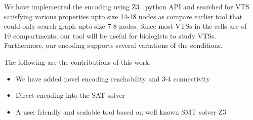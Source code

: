 We have implemented the encoding using Z3~\cite{z3} python API and searched for
VTS satisfying various properties upto size 14-18 nodes as compare
earlier tool that could only search graph upto size 7-8 nodes.
%
Since most VTSs in the cells are of 10 compartments,
our tool will be useful for biologists to study VTSs.
%
Furthermore, our encoding supports several variations of
the conditions.\newline

The following are the contributions of this work:
\begin{itemize}
\item We have added novel encoding reachability and 3-4 connectivity
\item Direct encoding into the SAT solver
\item A user friendly and scalable tool based on well known SMT solver Z3
\end{itemize}


